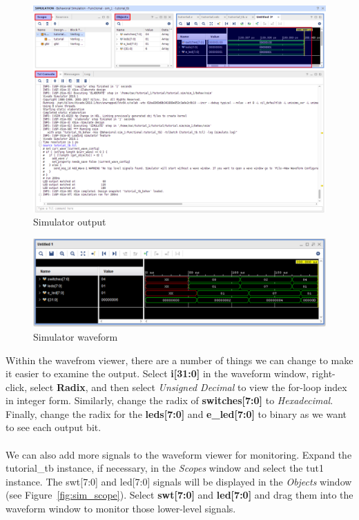 \documentclass[11pt]{article}
\begin{document}
\begin{figure}[!h]
    \centering
    \includegraphics[width=\textwidth]{images/sim_output.png}
    \caption{Simulator output}
    \label{fig:sim_output}
\end{figure}

\begin{figure}[!h]
    \centering
    \includegraphics[width=\textwidth]{images/sim_wave.png}
    \caption{Simulator waveform}
    \label{fig:sim_wave}
\end{figure}


Within the wavefrom viewer, there are a number of things we can change to make it easier to examine the output. Select \textbf{i[31:0]} in the waveform window, right-click, select \textbf{Radix}, and then select \textit{Unsigned Decimal} to view the for-loop index in integer form. Similarly, change the radix of \textbf{switches[7:0]} to \textit{Hexadecimal}. Finally, change the radix for the \textbf{leds[7:0]} and \textbf{e\_led[7:0]} to binary as we want to see each output bit. 
\\
\\

We can also add more signals to the waveform viewer for monitoring. Expand the tutorial\_tb instance, if necessary, in the \textit{Scopes} window and select the tut1 instance. The swt[7:0] and led[7:0] signals will be displayed in the \textit{Objects} window (see Figure~\ref{fig:sim_scope}). Select \textbf{swt[7:0]} and \textbf{led[7:0]} and drag them into the waveform window to monitor those lower-level signals.
\\
\\
\end{document}
